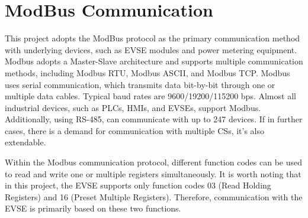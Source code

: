 \documentclass[
	english,
	ruledheaders=section,%
	class=report,%
	thesis={type=Report},%
	accentcolor=9c,%
	custommargins=true,%
	marginpar=false,%
	parskip=half-,%
	fontsize=11pt,%
	logofile={img/tuda_logo.pdf}, %
]{tudapub}
\begin{document}
\section{ModBus Communication}
\label{sec: modbus}






This project adopts the ModBus protocol as the primary communication method with underlying devices, such as EVSE modules and power metering equipment. Modbus adopts a Master-Slave architecture and supports multiple communication methods, including Modbus RTU, Modbus ASCII, and Modbus TCP\cite{modbus}. Modbus uses serial communication, which transmits data bit-by-bit through one or multiple data cables. Typical baud rates are 9600/19200/115200 bps. Almost all industrial devices, such as PLCs, HMIs, and EVSEs, support Modbus. Additionally, using RS-485, can communicate with up to 247 devices. If in further cases, there is a demand for communication with multiple \ac{CS}s, it's also extendable.

Within the Modbus communication protocol, different function codes can be used to read and write one or multiple registers simultaneously. It is worth noting that in this project, the EVSE supports only function codes 03 (Read Holding Registers) and 16 (Preset Multiple Registers). Therefore, communication with the EVSE is primarily based on these two functions.
\end{document}
